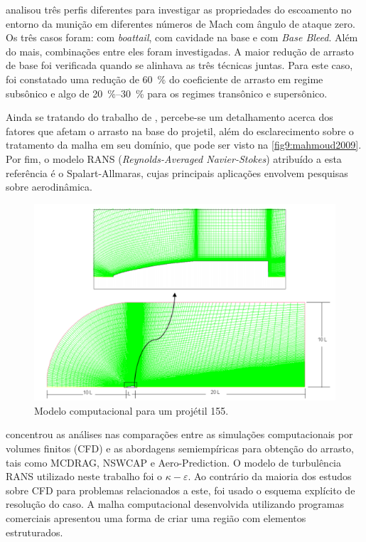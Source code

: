 \citeauthor{Mahmoud2009} analisou três perfis diferentes para investigar as propriedades do escoamento no entorno da munição em diferentes números de Mach com ângulo de ataque zero. Os três casos foram: com \textit{boattail}, com cavidade na base e com \textit{Base Bleed}. Além do mais, combinações entre eles foram investigadas. A maior redução de arrasto de base foi verificada quando se alinhava as três técnicas juntas. Para este caso, foi constatado uma redução de \qty{60}{\percent} do coeficiente de arrasto em regime subsônico e algo de \qtyrange{20}{30}{\percent} para os regimes transônico e supersônico. 
	
Ainda se tratando do trabalho de \citeauthor{Mahmoud2009}, percebe-se um detalhamento acerca dos fatores que afetam o arrasto na base do projetil, além do esclarecimento sobre o tratamento da malha em seu domínio, que pode ser visto na \autoref{fig9:mahmoud2009}. Por fim, o modelo RANS (\textit{Reynolds-Averaged Navier-Stokes}) atribuído a esta referência é o Spalart-Allmaras, cujas principais aplicações envolvem pesquisas sobre aerodinâmica.  

\begin{figure}[!ht]
	\centering
	\includegraphics[width=1.0\textwidth]{foto09-malha-mahmoud2009.png}
	\caption[Modelo computacional para um projétil \qty{155}{\millimetre}.]{Modelo computacional para um projétil \qty{155}{\millimetre}. \cite{Mahmoud2009}}
	\label{fig9:mahmoud2009}
\end{figure}

\citeauthor{torangatti2basawaraj} concentrou as análises nas comparações entre as simulações computacionais por volumes finitos (CFD) e as abordagens semiempíricas para obtenção do arrasto, tais como MCDRAG, NSWCAP e Aero-Prediction. O modelo de turbulência RANS utilizado neste trabalho foi o \(\kappa-\varepsilon\). Ao contrário da maioria dos estudos sobre CFD para problemas relacionados a este, foi usado o esquema explícito de resolução do caso. A malha computacional desenvolvida utilizando programas comerciais apresentou uma forma de criar uma região com elementos estruturados.
	
